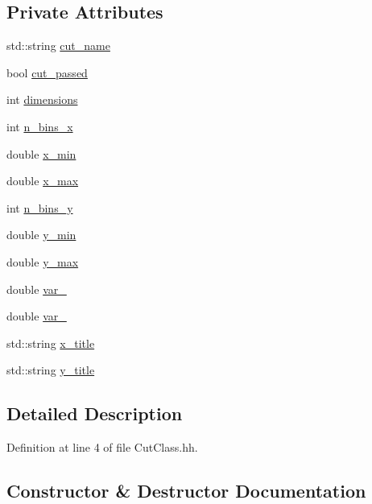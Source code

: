 \subsection*{Private Attributes}
\begin{DoxyCompactItemize}
\item 
std\-::string \hyperlink{classCuts_a0ed5314e60a9cdb43cb01dd3e6b17152}{cut\-\_\-name}
\item 
bool \hyperlink{classCuts_af27a75ec95b86920a5f181a36815c756}{cut\-\_\-passed}
\item 
int \hyperlink{classCuts_ac8a1b7c2f1b01a2ad9a90bdea47bcb51}{dimensions}
\item 
int \hyperlink{classCuts_aa85210c0202d13c328e0f1d7c0094804}{n\-\_\-bins\-\_\-x}
\item 
double \hyperlink{classCuts_a4e3e41f16721b728c361b5214609acbc}{x\-\_\-min}
\item 
double \hyperlink{classCuts_a38827082987aebf38960f33ce7a16429}{x\-\_\-max}
\item 
int \hyperlink{classCuts_abca69d36badd0c0a7444a2722db7c7d5}{n\-\_\-bins\-\_\-y}
\item 
double \hyperlink{classCuts_a63a13001d11785cfef2bb686216b4352}{y\-\_\-min}
\item 
double \hyperlink{classCuts_afecd199b8235871d84319eced64a134e}{y\-\_\-max}
\item 
double \hyperlink{classCuts_afd5e22efe86600e5b7540a2d9b4d149e}{var\-\_}
\item 
double \hyperlink{classCuts_a278df7d02bf3adcec75fb3a36302af99}{var\-\_}
\item 
std\-::string \hyperlink{classCuts_af1a4af3816d627a9f2bfcc9ee4a08489}{x\-\_\-title}
\item 
std\-::string \hyperlink{classCuts_a614ea94fe39f141a1ec195e99d01eecf}{y\-\_\-title}
\end{DoxyCompactItemize}


\subsection{Detailed Description}


Definition at line 4 of file Cut\-Class.\-hh.



\subsection{Constructor \& Destructor Documentation}
